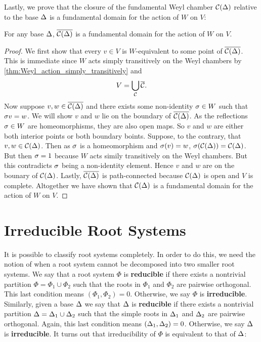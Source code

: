 \documentclass[12pt,reqno,oneside]{amsart}
\begin{document}
    Lastly, we prove that the closure of the fundamental Weyl chamber $\mathcal{C}(\Delta)$ relative to the base $\Delta$ is a fundamental domain for the action of $W$ on $V$:

    \begin{proposition}\label{prop:fundamental_domain}
        For any base $\Delta$, $\overline{\mathcal{C}(\Delta)}$ is a fundamental domain for the action of $W$ on $V$.
    \end{proposition}
    \begin{proof}
        We first show that every $v \in V$ is $W$-equivalent to some point of $\overline{\mathcal{C}(\Delta)}$. This is immediate since $W$ acts simply transitively on the Weyl chambers by \cref{thm:Weyl_action_simply_transitively} and
        \[
            V = \bigcup_{\mathcal{C}}\overline{\mathcal{C}}.
        \]
        Now suppose $v,w \in \overline{\mathcal{C}(\Delta)}$ and there exists some non-identity $\sigma \in W$ such that $\sigma v = w$. We will show $v$ and $w$ lie on the boundary of $\overline{\mathcal{C}(\Delta)}$. As the reflections $\sigma \in W$ are homeomorphisms, they are also open maps. So $v$ and $w$ are either both interior points or both boundary boints. Suppose, to the contrary, that $v,w \in \mathcal{C}(\Delta)$. Then as $\sigma$ is a homeomorphism and $\sigma(v) = w$, $\sigma(\mathcal{C}(\Delta)) = \mathcal{C}(\Delta)$. But then $\sigma = 1$ because $W$ acts simily transitively on the Weyl chambers. But this contradicts $\sigma$ being a non-identity element. Hence $v$ and $w$ are on the bounary of $\mathcal{C}(\Delta)$. Lastly, $\overline{\mathcal{C}(\Delta)}$ is path-connected because $\mathcal{C}(\Delta)$ is open and $V$ is complete. Altogether we have shown that $\mathcal{C}(\Delta)$ is a fundamental domain for the action of $W$ on $V$.
    \end{proof}
\section{Irreducible Root Systems}
    It is possible to classify root systems completely. In order to do this, we need the notion of when a root system cannot be decomposed into two smaller root systems. We say that a root system $\Phi$ is \textbf{reducible} if there exists a nontrivial partition $\Phi = \Phi_{1} \cup \Phi_{2}$ such that the roots in $\Phi_{1}$ and $\Phi_{2}$ are pairwise orthogonal. This last condition means $(\Phi_{1},\Phi_{2}) = 0$. Otherwise, we say $\Phi$ is \textbf{irreducible}. Similarly, given a base $\Delta$ we say that $\Delta$ is \textbf{reducible} if there exists a nontrivial partition $\Delta = \Delta_{1} \cup \Delta_{2}$ such that the simple roots in $\Delta_{1}$ and $\Delta_{2}$ are pairwise orthogonal. Again, this last condition means $(\Delta_{1},\Delta_{2}) = 0$. Otherwise, we say $\Delta$ is \textbf{irreducible}. It turns out that irreducibility of $\Phi$ is equivalent to that of $\Delta$:
    
\end{document}
